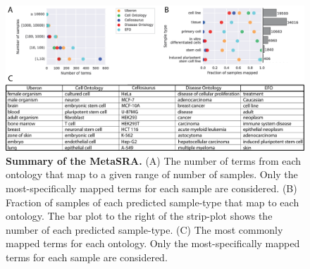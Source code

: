 \begin{figure}[!tpb]
\centerline{\includegraphics[width=13cm]{figures/metasra_summary.eps}}
\caption{\textbf{Summary of the MetaSRA.} (A) The number of terms from each ontology that map to a given range of number of samples.  Only the most-specifically mapped terms for each sample are considered. (B) Fraction of samples of each predicted sample-type that map to each ontology. The bar plot to the right of the strip-plot shows the number of each predicted sample-type. (C) The most commonly mapped terms for each ontology. Only the most-specifically mapped terms for each sample are considered.}
\label{fig:metasra_summary}
\end{figure}






























